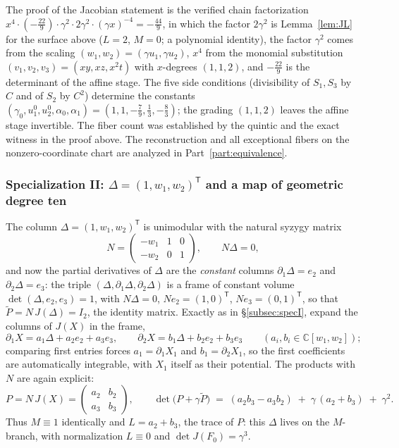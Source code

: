 \documentclass[11pt]{article}
\numberwithin{equation}{section}
\theoremstyle{plain}
\theoremstyle{definition}
\theoremstyle{remark}
\newcommand{\C}{\mathbb{C}}
\begin{document}
The proof of the Jacobian statement is the verified chain factorization
$x^4\cdot(-\tfrac{22}9)\cdot\gamma^2\cdot2\gamma^2\cdot(\gamma x)^{-4}
=-\tfrac{44}9$, in which the factor $2\gamma^2$ is Lemma~\ref{lem:JL} for the
surface above ($L=2$, $M=0$; a polynomial identity), the factor $\gamma^2$ comes
from the scaling $(w_1,w_2)=(\gamma u_1,\gamma u_2)$, $x^4$ from the monomial
substitution $(v_1,v_2,v_3)=(xy,xz,x^2t)$ with $x$-degrees $(1,1,2)$, and
$-\tfrac{22}9$ is the determinant of the affine stage. The five side conditions
(divisibility of $S_1,S_3$ by $C$ and of $S_2$ by $C^2$) determine the constants
$(\gamma_0,u_1^0,u_2^0,\alpha_0,\alpha_1)=(1,1,-\tfrac79,\tfrac13,-\tfrac83)$;
the grading $(1,1,2)$ leaves the affine stage invertible. The fiber count was
established by the quintic and the exact witness in the proof above.
The reconstruction and all exceptional fibers on the nonzero-coordinate
chart are analyzed in Part~\ref{part:equivalence}.

\subsubsection{Specialization II: \texorpdfstring{$\Delta=(1,w_1,w_2)^{\mathsf T}$}{the tautological field} and a map of geometric degree ten}
\label{subsec:specII}

The column $\Delta=(1,w_1,w_2)^{\mathsf T}$ is unimodular with the natural
syzygy matrix
\[
N=\begin{pmatrix}-w_1&1&0\\ -w_2&0&1\end{pmatrix},
\qquad N\Delta=0 ,
\]
and now the partial derivatives of $\Delta$ are the \emph{constant} columns
$\partial_1\Delta=e_2$ and $\partial_2\Delta=e_3$: the triple
$(\Delta,\partial_1\Delta,\partial_2\Delta)$ is a frame of constant volume
$\det(\Delta,e_2,e_3)=1$, with $N\Delta=0$, $Ne_2=(1,0)^{\mathsf T}$,
$Ne_3=(0,1)^{\mathsf T}$, so that $\widetilde P=N\,J(\Delta)=I_2$, the identity
matrix. Exactly as in \S\ref{subsec:specI}, expand the columns of $J(X)$ in the
frame,
\[
\partial_1X=a_1\Delta+a_2e_2+a_3e_3,\qquad
\partial_2X=b_1\Delta+b_2e_2+b_3e_3
\qquad(a_i,b_i\in\C[w_1,w_2]);
\]
comparing first entries forces $a_1=\partial_1X_1$ and $b_1=\partial_2X_1$, so
the first coefficients are automatically integrable, with $X_1$ itself as their
potential. The products with $N$ are again explicit:
\[
P=N\,J(X)=\begin{pmatrix}a_2 & b_2\\ a_3 & b_3\end{pmatrix},
\qquad
\det\bigl(P+\gamma\widetilde P\bigr)
\;=\;(a_2b_3-a_3b_2)\;+\;\gamma\,(a_2+b_3)\;+\;\gamma^2 .
\]
Thus $M\equiv1$ identically and $L=a_2+b_3$, the trace of $P$: this $\Delta$
lives on the $M$-branch, with normalization $L\equiv0$ and
$\det J(F_0)=\gamma^3$.
\end{document}
